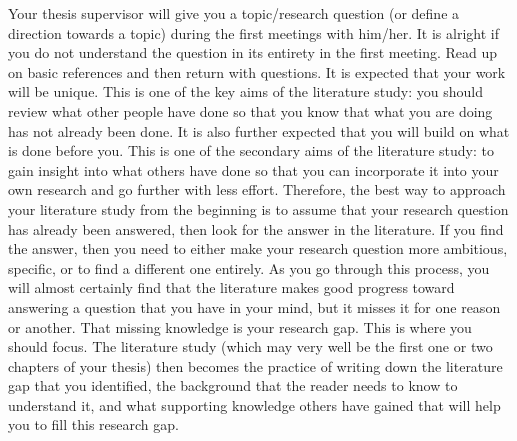 \documentclass{article}
\begin{document}
Your thesis supervisor will give you a topic/research question (or define a direction towards a topic) during the first meetings with him/her. It is alright if you do not understand the question in its entirety in the first meeting. Read up on basic references and then return with questions. It is expected that your work will be unique. This is one of the key aims of the literature study: you should review what other people have done so that you know that what you are doing has not already been done. It is also further expected that you will build on what is done before you. This is one of the secondary aims of the literature study: to gain insight into what others have done so that you can incorporate it into your own research and go further with less effort. Therefore, the best way to approach your literature study from the beginning is to assume that your research question has already been answered, then look for the answer in the literature. If you find the answer, then you need to either make your research question more ambitious, specific, or to find a different one entirely. As you go through this process, you will almost certainly find that the literature makes good progress toward answering a question that you have in your mind, but it misses it for one reason or another. That missing knowledge is your research gap. This is where you should focus. The literature study (which may very well be the first one or two chapters of your thesis) then becomes the practice of writing down the literature gap that you identified, the background that the reader needs to know to understand it, and what supporting knowledge others have gained that will help you to fill this research gap. 
\end{document}
